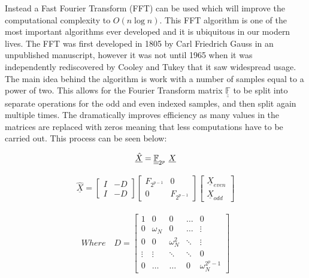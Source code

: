 \documentclass[12pt]{report}
\def\doubleunderline#1{\underline{\underline{#1}}}
\begin{document}
Instead a Fast Fourier Transform (FFT) can be used which will improve the computational complexity to $O(n\log{n})$. This FFT algorithm is one of the most important algorithms ever developed and it is ubiquitous in our modern lives. The FFT was first developed in 1805 by Carl Friedrich Gauss in an unpublished manuscript\cite{gauss}, however it was not until 1965 when it was independently rediscovered by Cooley and Tukey\cite{cooley} that it saw widespread usage. The main idea behind the algorithm is work with a number of samples equal to a power of two. This allows for the Fourier Transform matrix $\doubleunderline{\mathbb{F}}$ to be split into separate operations for the odd and even indexed samples, and then split again multiple times. The dramatically improves efficiency as many values in the matrices are replaced with zeros meaning that less computations have to be carried out. This process can be seen below:

\begin{align*}
    \underline{\hat{X}} = \doubleunderline{\mathbb{F}}_{2^p} \mkern6mu \underline{X}
\end{align*}

\begin{align*}
    \underline{\hat{X}} =
    \begin{bmatrix} 
        I & -D \\
        I & -D
    \end{bmatrix}
    \begin{bmatrix} 
        F_{2^{p-1}} & 0 \\
        0 & F_{2^{p-1}}
    \end{bmatrix}
    \begin{bmatrix} 
        \underline{X}_{even} \\
        \underline{X}_{odd}
    \end{bmatrix}
\end{align*}

\begin{align*}
    Where \quad D = 
    \begin{bmatrix} 
    1 & 0 & 0 & \dots & 0\\
    0 & \omega_N  & 0 & \dots & \vdots\\
    0 & 0 & \omega_N^2 & \ddots & \vdots\\
    \vdots & \vdots & \ddots & \ddots & 0\\
    0 & \dots & \dots & 0 &  \omega_N^{2^{p}-1}
    \end{bmatrix}
\end{align*}
\end{document}
